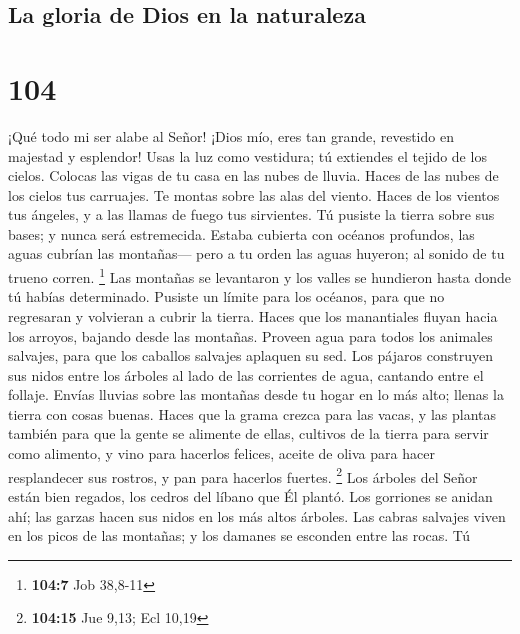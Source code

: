 \hypertarget{la-gloria-de-dios-en-la-naturaleza}{%
\subsection{La gloria de Dios en la
naturaleza}\label{la-gloria-de-dios-en-la-naturaleza}}

\hypertarget{section-103}{%
\section{104}\label{section-103}}

 ¡Qué todo mi ser alabe al Señor! ¡Dios mío, eres tan
grande, revestido en majestad y esplendor!  Usas la luz como
vestidura; tú extiendes el tejido de los cielos.  Colocas
las vigas de tu casa en las nubes de lluvia. Haces de las nubes de los
cielos tus carruajes. Te montas sobre las alas del viento. 
Haces de los vientos tus ángeles, y a las llamas de fuego tus
sirvientes.  Tú pusiste la tierra sobre sus bases; y nunca
será estremecida.  Estaba cubierta con océanos profundos,
las aguas cubrían las montañas---  pero a tu orden las aguas
huyeron; al sonido de tu trueno corren. \footnote{\textbf{104:7} Job
  38,8-11}  Las montañas se levantaron y los valles se
hundieron hasta donde tú habías determinado.  Pusiste un
límite para los océanos, para que no regresaran y volvieran a cubrir la
tierra.  Haces que los manantiales fluyan hacia los
arroyos, bajando desde las montañas.  Proveen agua para
todos los animales salvajes, para que los caballos salvajes aplaquen su
sed.  Los pájaros construyen sus nidos entre los árboles al
lado de las corrientes de agua, cantando entre el follaje. 
Envías lluvias sobre las montañas desde tu hogar en lo más alto; llenas
la tierra con cosas buenas.  Haces que la grama crezca para
las vacas, y las plantas también para que la gente se alimente de ellas,
cultivos de la tierra para servir como alimento,  y vino
para hacerlos felices, aceite de oliva para hacer resplandecer sus
rostros, y pan para hacerlos fuertes. \footnote{\textbf{104:15} Jue
  9,13; Ecl 10,19}  Los árboles del Señor están bien
regados, los cedros del líbano que Él plantó.  Los
gorriones se anidan ahí; las garzas hacen sus nidos en los más altos
árboles.  Las cabras salvajes viven en los picos de las
montañas; y los damanes se esconden entre las rocas.  Tú
